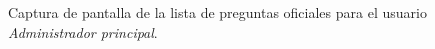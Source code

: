   \begin{figure}[!ht]
    \begin{center}
      \caption{Captura de pantalla de la lista de preguntas oficiales para el usuario \textit{Administrador principal}.}
      \label{capturaPantallaListaPreguntasOficialesAdminPrincipal}
    \end{center}
  \end{figure}
